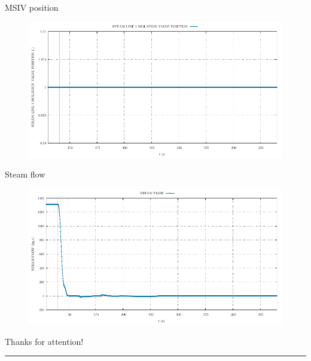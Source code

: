 \begin{frame}{MSIV position}
	\begin{figure}
		\centering
		\includegraphics[width=\textwidth]{./graphs/STEAM LINE 1 ISOLATION VALVE POSITION_comp.pdf}
		
	\end{figure}
	
\end{frame}

\begin{frame}{Steam flow}
	\begin{figure}
		\centering
		\includegraphics[width=\textwidth]{./graphs/STEAM FLOW_comp.pdf}
		
	\end{figure}
	
\end{frame}




\begin{frame}
\Large{{Thanks for attention!}}
\vspace{0.5cm}
\hrule
\vspace{3cm}
\end{frame}

\nologo



